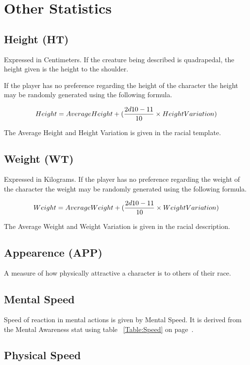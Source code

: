 


\section{Other Statistics}

\subsection{Height (HT)} Expressed in Centimeters. If the creature
being described is quadrapedal, the height given is the height
to the shoulder.

If the player has no preference regarding the height of the character
the height may be randomly generated using the following formula.

\[ Height = {Average Height} + ( {{2d10 - 11} \over {10}} \times
{Height Variation} )
\]

The Average Height and Height Variation is given in the racial
template.

\subsection{Weight (WT)} Expressed in Kilograms. If the player has no 
preference regarding the weight of the character the weight may be 
randomly generated using the following formula. 

\[ Weight = {Average Weight} + ( {{2d10 - 11} \over {10}} \times
{Weight Variation})
\]

The Average Weight and Weight Variation is given in the racial
description.

\subsection{Appearence        (APP)}
A measure of how physically attractive a character is
to others of their race.

\subsection{Mental Speed}

Speed of reaction in mental actions is given by 
Mental Speed. It is derived from the
Mental Awareness stat using table ~\ref{Table:Speed} on page~\pageref{Table:Speed}.

\subsection{Physical Speed}

